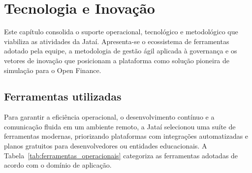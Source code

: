 \documentclass[
  12pt,
  openright,
  oneside,
  a4paper,
  brazilian
]{abntex2}
\begin{document}
\chapter{Tecnologia e Inovação}
\label{cap:ferramentas_gestao_inovacoes}

Este capítulo consolida o suporte operacional, tecnológico e metodológico que viabiliza as atividades da Jataí. Apresenta-se o ecossistema de ferramentas adotado pela equipe, a metodologia de gestão ágil aplicada à governança e os vetores de inovação que posicionam a plataforma como solução pioneira de simulação para o Open Finance.

\section{Ferramentas utilizadas}
\label{sec:ferramentas_utilizadas}

Para garantir a eficiência operacional, o desenvolvimento contínuo e a comunicação fluida em um ambiente remoto, a Jataí selecionou uma suíte de ferramentas modernas, priorizando plataformas com integrações automatizadas e planos gratuitos para desenvolvedores ou entidades educacionais. A Tabela~\ref{tab:ferramentas_operacionais} categoriza as ferramentas adotadas de acordo com o domínio de aplicação.
\end{document}

